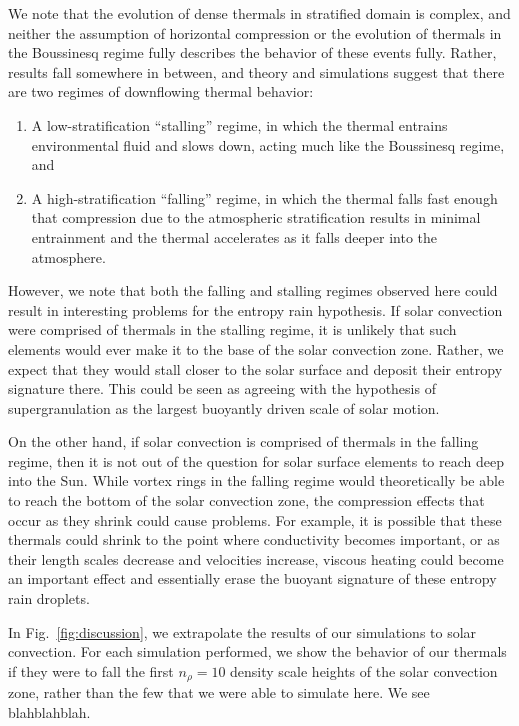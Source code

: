 \documentclass[twocolumn, amsmath, amsfonts, amssymb, trackchanges]{aastex62}
\begin{document}
We note that the evolution of dense thermals in stratified domain is complex, and neither the assumption of horizontal compression \citep[as in e.g.][]{brandenburg2016} or the evolution of thermals in the Boussinesq regime fully describes the behavior of these events fully.
Rather, results fall somewhere in between, and theory and simulations suggest that there are two regimes of downflowing thermal behavior:
\begin{enumerate}
\item A low-stratification ``stalling'' regime, in which the thermal entrains environmental fluid and slows down, acting much like the Boussinesq regime, and
\item A high-stratification ``falling'' regime, in which the thermal falls fast enough that compression due to the atmospheric stratification results in minimal entrainment and the thermal accelerates as it falls deeper into the atmosphere.
\end{enumerate}

However, we note that both the falling and stalling regimes observed here could result in interesting problems for the entropy rain hypothesis. 
If solar convection were comprised of thermals in the stalling regime, it is unlikely that such elements would ever make it to the base of the solar convection zone.
Rather, we expect that they would stall closer to the solar surface and deposit their entropy signature there. 
This could be seen as agreeing with the hypothesis of supergranulation as the largest buoyantly driven scale of solar motion.

On the other hand, if solar convection is comprised of thermals in the falling regime, then it is not out of the question for solar surface elements to reach deep into the Sun.
While vortex rings in the falling regime would theoretically be able to reach the bottom of the solar convection zone, the compression effects that occur as they shrink could cause problems.
For example, it is possible that these thermals could shrink to the point where conductivity becomes important, or as their length scales decrease and velocities increase, viscous heating could become an important effect and essentially erase the buoyant signature of these entropy rain droplets.

In Fig.~\ref{fig:discussion}, we extrapolate the results of our simulations to solar convection.
For each simulation performed, we show the behavior of our thermals if they were to fall the first $n_\rho = 10$ density scale heights of the solar convection zone, rather than the few that we were able to simulate here.
We see blahblahblah.
\end{document}
